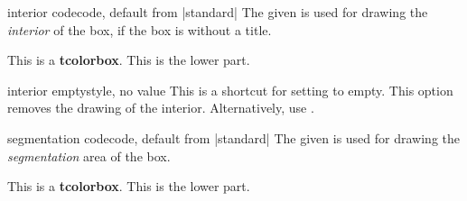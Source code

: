 \begin{docTcbKey}{interior code}{}{code, default from |standard|}
  The given  is used
  for drawing the \emph{interior} of the box, if the box is without a title.%
\begin{dispExample}

\begin{tcolorbox}[enhanced,interior code={
  \path[draw=red!5!white,line width=5mm,line cap=round]
    ([xshift=3mm,yshift=-3mm]interior.north west)
    --([xshift=-3mm,yshift=3mm]interior.south east)
    ([xshift=3mm,yshift=3mm]interior.south west)
    --([xshift=-3mm,yshift=-3mm]interior.north east);}]
This is a \textbf{tcolorbox}.
\tcblower
This is the lower part.
\end{tcolorbox}
\end{dispExample}
\end{docTcbKey}

\begin{docTcbKey}{interior empty}{}{style, no value}
  This is a shortcut for setting   to empty.
  This option removes the drawing of the interior.
  Alternatively, use .
\end{docTcbKey}


\begin{docTcbKey}{segmentation code}{}{code, default from |standard|}
  The given  is used for drawing the
  \emph{segmentation} area of the box.%
\begin{dispExample}

\begin{tcolorbox}[enhanced,title=My title,segmentation code={
  \path[top color=red!5!white,bottom color=red!5!white,middle color=blue]
  (segmentation.south west) rectangle (segmentation.north east);}]
This is a \textbf{tcolorbox}.
\tcblower
This is the lower part.
\end{tcolorbox}
\end{dispExample}
\end{docTcbKey}


